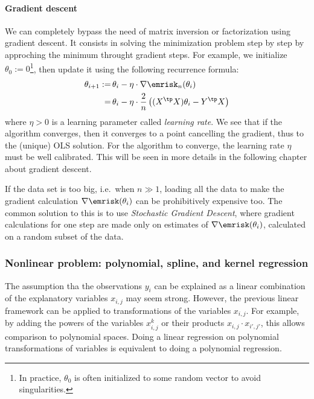 \documentclass[toc, titlepaged]{../cs-classes/cs-classes}
\begin{document}
\paragraph*{Gradient descent}
We can completely bypass the need of matrix inversion or factorization using gradient descent. It consists in solving the minimization problem step by step by approching the minimum throught gradient steps. For example, we initialize $\theta_0:=0$\footnote{In practice, $\theta_0$ is often initialized to some random vector to avoid singularities.}, then update it using the following recurrence formula:
\begin{equation*}
    \begin{aligned}
        \theta_{i+1} :=&\, \theta_i -\eta\cdot\nabla\emrisk_n(\theta_i)\\
        =&\, \theta_i - \eta\cdot\frac{2}{n}\left((X^\tp X)\theta_i - Y^\tp X\right)
    \end{aligned}
\end{equation*}
where $\eta>0$ is a learning parameter called \emph{learning rate}. We see that if the algorithm converges, then it converges to a point cancelling the gradient, thus to the (unique) OLS solution. For the algorithm to converge, the learning rate $\eta$ must be well calibrated. This will be seen in more details in the following chapter about gradient descent.

If the data set is too big, i.e.~when $n\gg1$, loading all the data to make the gradient calculation $\nabla\emrisk(\theta_i)$ can be prohibitively expensive too. The common solution to this is to use \emph{Stochastic Gradient Descent}, where gradient calculations for one step are made only on estimates of $\nabla\emrisk(\theta_i)$, calculated on a random subset of the data.

\subsubsection{Nonlinear problem: polynomial, spline, and kernel regression}
The assumption tha the observations $y_i$ can be explained as a linear combination of the explanatory variables $x_{i, j}$ may seem strong. However, the previous linear framework can be applied to transformations of the variables $x_{i, j}$. For example, by adding the powers of the variables $x^k_{i, j}$ or their products $x_{i, j}\cdot x_{i', j'}$, this allows comparison to polynomial spaces. Doing a linear regression on polynomial transformations of variables is equivalent to doing a polynomial regression.
\end{document}
